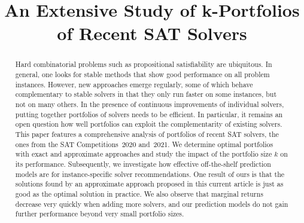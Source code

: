 \documentclass[conference]{IEEEtran}
\begin{document}
\title{An Extensive Study of k-Portfolios\\ of Recent SAT Solvers}

\author{
	\and
	\and
}

\maketitle

\begin{abstract}
Hard combinatorial problems such as propositional satisfiability are ubiquitous. 
In general, one looks for stable methods that show good performance on all problem instances. 
However, new approaches emerge regularly, some of which behave complementary to stable solvers in that they only run faster on some instances, but not on many others. 
In the presence of continuous improvements of individual solvers, putting together portfolios of solvers needs to be efficient. 
In particular, it remains an open question how well portfolios can exploit the complementarity of existing solvers. 
This paper features a comprehensive analysis of portfolios of recent SAT solvers, the ones from the SAT Competitions~2020 and~2021. 
We determine optimal portfolios with exact and approximate approaches and study the impact of the portfolio size $k$ on its performance. 
Subsequently, we investigate how effective off-the-shelf prediction models are for instance-specific solver recommendations.
One result of ours is that the solutions found by an approximate approach proposed in this current article is just as good as the optimal solution in practice. 
We also observe that marginal returns decrease very quickly when adding more solvers, and our prediction models do not gain further performance beyond very small portfolio sizes. 
\end{abstract}
\end{document}

